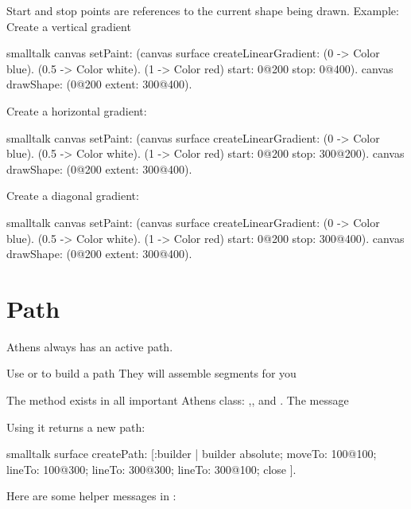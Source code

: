 \documentclass[10pt,twoside,english]{_support/latex/sbabook/sbabook}
\begin{document}
Start and stop points are references to the current shape being drawn.
Example:
Create a vertical gradient
\begin{displaycode}{smalltalk}
canvas
    setPaint:
        (canvas surface
            createLinearGradient:
                {(0 -> Color blue).
                (0.5 -> Color white).
                (1 -> Color red)}
            start: 0@200
            stop: 0@400). 
    canvas drawShape: (0@200 extent: 300@400).
\end{displaycode}

Create a horizontal gradient:
\begin{displaycode}{smalltalk}
canvas
    setPaint:
        (canvas surface
            createLinearGradient:
                {(0 -> Color blue).
                (0.5 -> Color white).
                (1 -> Color red)}
            start: 0@200
            stop: 300@200). 
    canvas drawShape: (0@200 extent: 300@400).
\end{displaycode}

Create a diagonal gradient:
\begin{displaycode}{smalltalk}
canvas
    setPaint:
        (canvas surface
            createLinearGradient:
                {(0 -> Color blue).
                (0.5 -> Color white).
                (1 -> Color red)}
            start: 0@200
            stop: 300@400). 
    canvas drawShape: (0@200 extent: 300@400).
\end{displaycode}

\section{Path}
Athens always has an active path.

Use  or  to build a path
They will assemble segments for you

The method  exists in all important Athens class: ,, and  .
The message 

Using it returns a new path:
\begin{displaycode}{smalltalk}
surface createPath: [:builder |
  builder
   absolute;
   moveTo: 100@100;
   lineTo: 100@300;
   lineTo: 300@300;
   lineTo: 300@100;
   close ].
\end{displaycode}

Here are some helper messages in :
\end{document}
